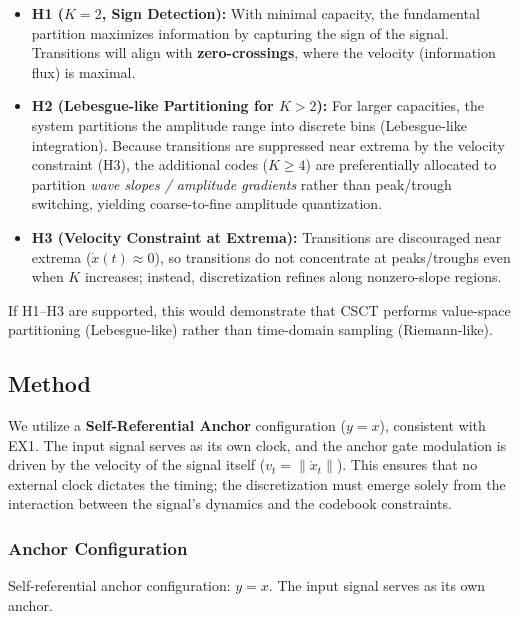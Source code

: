 \documentclass{article}
\begin{document}
\begin{itemize}
    \item \textbf{H1 ($K=2$, Sign Detection):} With minimal capacity, the fundamental partition maximizes information by capturing the sign of the signal. Transitions will align with \textbf{zero-crossings}, where the velocity (information flux) is maximal.
    
    \item \textbf{H2 (Lebesgue-like Partitioning for $K>2$):} For larger capacities, the system partitions the amplitude range into discrete bins (Lebesgue-like integration). Because transitions are suppressed near extrema by the velocity constraint (H3), the additional codes ($K \ge 4$) are preferentially allocated to partition \emph{wave slopes / amplitude gradients} rather than peak/trough switching, yielding coarse-to-fine amplitude quantization.
    
    \item \textbf{H3 (Velocity Constraint at Extrema):} Transitions are discouraged near extrema ($\dot{x}(t)\approx 0$), so transitions do not concentrate at peaks/troughs even when $K$ increases; instead, discretization refines along nonzero-slope regions.
\end{itemize}

If H1--H3 are supported, this would demonstrate that CSCT performs value-space partitioning (Lebesgue-like) rather than time-domain sampling (Riemann-like).

\subsection{Method}
We utilize a \textbf{Self-Referential Anchor} configuration ($y=x$), consistent with EX1. The input signal serves as its own clock, and the anchor gate modulation is driven by the velocity of the signal itself ($v_t = \|\dot{x}_t\|$). This ensures that no external clock dictates the timing; the discretization must emerge solely from the interaction between the signal's dynamics and the codebook constraints.

\subsubsection{Anchor Configuration}
Self-referential anchor configuration: $y = x$. The input signal serves as its own anchor.
\end{document}
